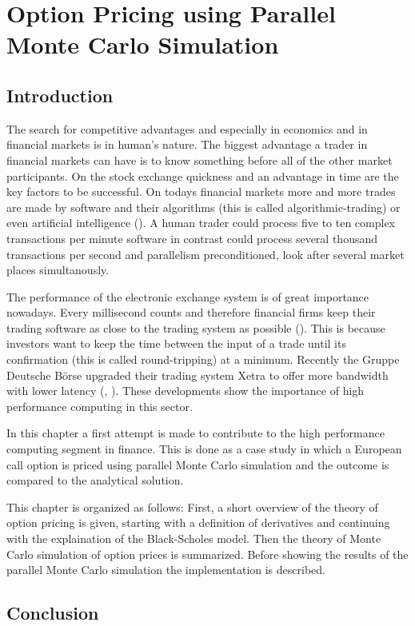 \chapter{Option Pricing using Parallel Monte Carlo Simulation}
\label{chap:options}
\section{Introduction}
\label{sec:optionintro}

The search for competitive advantages and especially in economics and in
financial markets is in human's nature. The biggest advantage a trader
in financial markets can have is to know something before all of the
other market participants. On the stock exchange quickness and an advantage
in time are the key factors to be successful. On todays financial
markets more and more trades are made by software and their
algorithms (this is called algorithmic-trading) or even artificial
intelligence (\cite{bloomberg:hal9000}). A human trader could
process five to ten complex 
transactions per minute software in contrast could process several
thousand transactions per second and parallelism preconditioned, look
after several market places simultanously.


The performance of the electronic exchange system is of great
importance nowadays. Every millisecond counts and therefore financial
firms keep their trading software as close to the trading system as
possible (\cite{wstonline:cuttingedge}). This is because investors
want to keep the time
between the input of a trade until its confirmation (this is called
round-tripping) at a minimum. Recently the Gruppe Deutsche B\"orse
upgraded their trading 
system Xetra to offer more bandwidth with lower latency (\cite{gdb:latency},
\cite{gdb:bandwidth}).
These developments show the importance of high performance computing
in this sector.


In this chapter a first attempt is made to contribute to the high performance
computing segment in finance. This is done as a case study in which a
European call option is priced using parallel Monte Carlo
simulation and the outcome is compared to the analytical solution.

This chapter is organized as follows: First, a short overview of the
theory of option pricing is given, starting with a definition of
derivatives and continuing with the explaination of the Black-Scholes
model. Then the theory of Monte Carlo simulation of option prices is
summarized. Before showing the results of the parallel Monte Carlo
simulation the implementation is described.




\section{Conclusion}

